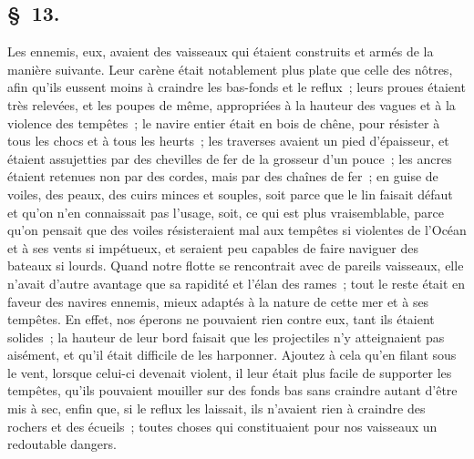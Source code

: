 \documentclass[french,twoside]{book} %
\begin{document}
\subsection[{§ 13.}]{ \textsc{§ 13.} }
\noindent Les ennemis, eux, avaient des vaisseaux qui étaient construits et armés de la manière suivante. Leur carène était notablement plus plate que celle des nôtres, afin qu’ils eussent moins à craindre les bas-fonds et le reflux ; leurs proues étaient très relevées, et les poupes de même, appropriées à la hauteur des vagues et à la violence des tempêtes ; le navire entier était en bois de chêne, pour résister à tous les chocs et à tous les heurts ; les traverses avaient un pied d’épaisseur, et étaient assujetties par des chevilles de fer de la grosseur d’un pouce ; les ancres étaient retenues non par des cordes, mais par des chaînes de fer ; en guise de voiles, des peaux, des cuirs minces et souples, soit parce que le lin faisait défaut et qu’on n’en connaissait pas l’usage, soit, ce qui est plus vraisemblable, parce qu’on pensait que des voiles résisteraient mal aux tempêtes si violentes de l’Océan et à ses vents si impétueux, et seraient peu capables de faire naviguer des bateaux si lourds. Quand notre flotte se rencontrait avec de pareils vaisseaux, elle n’avait d’autre avantage que sa rapidité et l’élan des rames ; tout le reste était en faveur des navires ennemis, mieux adaptés à la nature de cette mer et à ses tempêtes. En effet, nos éperons ne pouvaient rien contre eux, tant ils étaient solides ; la hauteur de leur bord faisait que les projectiles n’y atteignaient pas aisément, et qu’il était difficile de les harponner. Ajoutez à cela qu’en filant sous le vent, lorsque celui-ci devenait violent, il leur était plus facile de supporter les tempêtes, qu’ils pouvaient mouiller sur des fonds bas sans craindre autant d’être mis à sec, enfin que, si le reflux les laissait, ils n’avaient rien à craindre des rochers et des écueils ; toutes choses qui constituaient pour nos vaisseaux un redoutable dangers.
\end{document}
